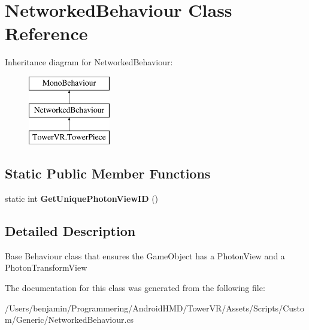 \hypertarget{class_networked_behaviour}{}\section{Networked\+Behaviour Class Reference}
\label{class_networked_behaviour}
Inheritance diagram for Networked\+Behaviour\+:\begin{figure}[H]
\begin{center}
\leavevmode
\includegraphics[height=3.000000cm]{class_networked_behaviour}
\end{center}
\end{figure}
\subsection*{Static Public Member Functions}
\begin{DoxyCompactItemize}
\item 
static int {\bfseries Get\+Unique\+Photon\+View\+ID} ()\hypertarget{class_networked_behaviour_a59d7978c054fa5226c43a82566d35877}{}\label{class_networked_behaviour_a59d7978c054fa5226c43a82566d35877}

\end{DoxyCompactItemize}


\subsection{Detailed Description}
Base Behaviour class that ensures the Game\+Object has a Photon\+View and a Photon\+Transform\+View 

The documentation for this class was generated from the following file\+:\begin{DoxyCompactItemize}
\item 
/\+Users/benjamin/\+Programmering/\+Android\+H\+M\+D/\+Tower\+V\+R/\+Assets/\+Scripts/\+Custom/\+Generic/Networked\+Behaviour.\+cs\end{DoxyCompactItemize}
